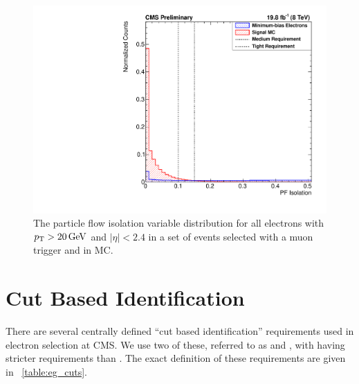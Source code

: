 \begin{figure}[!htbp]
    \centering
    \includegraphics[width=\StackedPlotWidth]{figures/e_reco_var_iso.pdf}
    \caption[
        Distributions of particle flow isolation variables in data and MC.
    ]{
        The particle flow isolation variable distribution for all electrons
        with $p_{\mathrm{T}} > 20 \,\text{Ge\hspace{-.08em}V}$ and $|\eta| < 2.4$ in a set of events selected
        with a muon trigger and in \MADGRAPH \Ztoee MC.
    }
    \label{fig:pf_iso}
\end{figure}

\section{Cut Based Identification}
\label{sec:cut_based_id}

There are several centrally defined ``cut based identification'' requirements
used in electron selection at CMS. We use two of these, referred to as
\EGMEDIUM and \EGTIGHT, with \EGTIGHT having stricter requirements than
\EGMEDIUM. The exact definition of these requirements are given in
\TAB~\ref{table:eg_cuts}.

